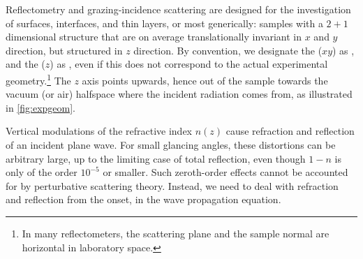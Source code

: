 Reflectometry and grazing-incidence scattering
are designed for the investigation of surfaces, interfaces, and thin layers,
or most generically:
samples with a $2+1$ dimensional structure
that are on average translationally invariant in $x$ and $y$ direction,
but structured in $z$ direction.
%
%
%
By convention,
we designate the  ($xy$) as ,
%
%
and the  ($z$) as ,
%
%
%
even if this does not correspond to the actual experimental geometry.\footnote
{In many reflectometers,
 the scattering plane and the sample normal are horizontal in laboratory space.}
The $z$ axis points upwards, hence out of the sample towards the
vacuum (or air) halfspace where the incident radiation comes from,
as illustrated in \cref{fig:expgeom}.

Vertical modulations of the refractive index $n(z)$
cause refraction and reflection of an incident plane wave.
%
%
%
For small glancing angles,
these distortions can be arbitrary large,
up to the limiting case of total reflection,
even though $1-n$ is only of the order $10^{-5}$ or smaller.
Such zeroth-order effects cannot be accounted for
by perturbative scattering theory.
Instead, we need to deal with refraction and reflection
from the onset, in the wave propagation equation.

